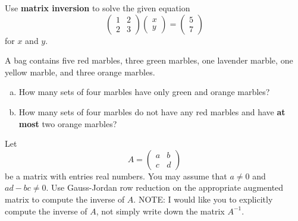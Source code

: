 \documentclass[12pt]{amsart}
\begin{document}
\begin{thm}[10 Points]
  Use {\bf matrix inversion} to solve the given equation
  $$\left(\begin{array}{rr}
    1 & 2 \\
    2 & 3
  \end{array}\right) \left(\begin{array}{r}
    x \\
    y
  \end{array}\right) = \left(\begin{array}{r}
    5 \\
    7
  \end{array}\right)$$
  for $x$ and $y$.
  
\end{thm}
\newpage


\begin{thm}[10 Points]\label{ex1}
  A bag contains five red marbles, three green marbles, one lavender marble, one yellow marble, and three orange marbles.
  \begin{enumerate}[(a)]
  \item
    How many sets of four marbles have only green and orange marbles?
    \vspace{2in}
  \item
    How many sets of four marbles do not have any red marbles and have {\bf at most} two orange marbles?
    \vspace{2in}
  \end{enumerate}
\end{thm}

\newpage

\begin{thm}\label{bonus}
  Let 
  $$A = \left(\begin{array}{cc} 
    a & b\\
    c & d
  \end{array}\right)$$
  be a matrix with entries real numbers.
  You may assume that $a \neq 0$ and $ad - bc \neq 0$.
  Use Gauss-Jordan row reduction on the appropriate augmented matrix to compute the inverse of $A$.
  NOTE:  I would like you to explicitly compute the inverse of $A$, not simply write down the matrix $A^{-1}$.
\end{thm}

\end{document}
